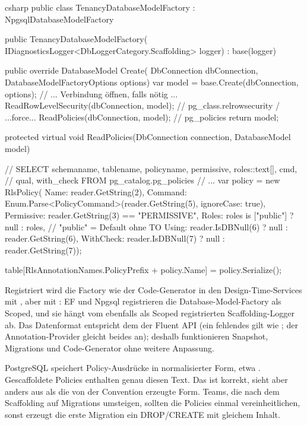 \begin{sourcecode}{csharp}
public class TenancyDatabaseModelFactory : NpgsqlDatabaseModelFactory
{
    public TenancyDatabaseModelFactory(
        IDiagnosticsLogger<DbLoggerCategory.Scaffolding> logger)
        : base(logger)
    {
    }

    public override DatabaseModel Create(
        DbConnection dbConnection, DatabaseModelFactoryOptions options)
    {
        var model = base.Create(dbConnection, options);
        // ... Verbindung öffnen, falls nötig ...
        ReadRowLevelSecurity(dbConnection, model);    // pg_class.relrowsecurity / ...force...
        ReadPolicies(dbConnection, model);            // pg_policies
        return model;
    }

    protected virtual void ReadPolicies(DbConnection connection, DatabaseModel model)
    {
        // SELECT schemaname, tablename, policyname, permissive, roles::text[], cmd,
        //        qual, with_check FROM pg_catalog.pg_policies
        // ...
        var policy = new RlsPolicy(
            Name: reader.GetString(2),
            Command: Enum.Parse<PolicyCommand>(reader.GetString(5), ignoreCase: true),
            Permissive: reader.GetString(3) == "PERMISSIVE",
            Roles: roles is ["public"] ? null : roles,    // "public" = Default ohne TO
            Using: reader.IsDBNull(6) ? null : reader.GetString(6),
            WithCheck: reader.IsDBNull(7) ? null : reader.GetString(7));

        table[RlsAnnotationNames.PolicyPrefix + policy.Name] = policy.Serialize();
    }
}
\end{sourcecode}

Registriert wird die Factory wie der Code-Generator in den Design-Time-Services mit
, aber mit : EF und Npgsql
registrieren die Database-Model-Factory als Scoped, und sie hängt vom ebenfalls als Scoped registrierten
Scaffolding-Logger ab. Das Datenformat entspricht dem der Fluent API (ein fehlendes  gilt wie ;
der Annotation-Provider gleicht beides an); deshalb
funktionieren Snapshot, Migrations und Code-Generator ohne weitere Anpassung.

\begin{note}
  PostgreSQL speichert Policy-Ausdrücke in normalisierter Form, etwa
  . Gescaffoldete Policies enthalten genau diesen
  Text. Das ist korrekt, sieht aber anders aus als die von der Convention erzeugte Form.
  Teams, die nach dem Scaffolding auf Migrations umsteigen, sollten die Policies einmal
  vereinheitlichen, sonst erzeugt die erste Migration ein DROP/CREATE mit gleichem Inhalt.
\end{note}


